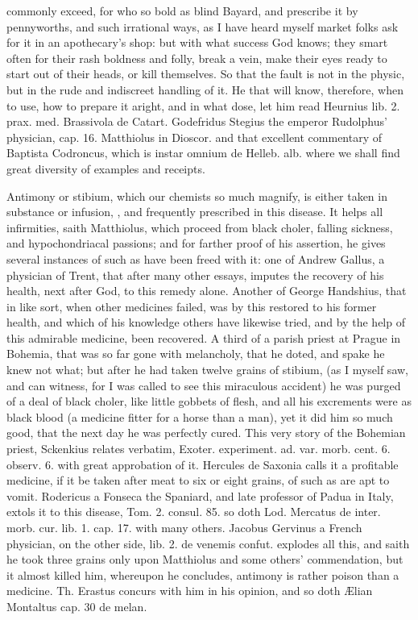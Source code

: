 {commonly exceed, for who so bold as blind Bayard, and prescribe it by
pennyworths, and such irrational ways, as I have heard myself market
folks ask for it in an apothecary's shop: but with what success God
knows; they smart often for their rash boldness and folly, break a
vein, make their eyes ready to start out of their heads, or kill
themselves. So that the fault is not in the physic, but in the rude and
indiscreet handling of it. He that will know, therefore, when to use,
how to prepare it aright, and in what dose, let him read Heurnius lib.
2. prax. med. Brassivola de Catart. Godefridus Stegius the emperor
Rudolphus' physician, cap. 16. Matthiolus in Dioscor. and that
excellent commentary of Baptista Codroncus, which is instar omnium de
Helleb. alb. where we shall find great diversity of examples and
receipts.

Antimony or stibium, which our chemists so much magnify, is either
taken in substance or infusion, \etc{}, and frequently prescribed in this
disease. It helps all infirmities, saith Matthiolus, which
proceed from black choler, falling sickness, and hypochondriacal
passions; and for farther proof of his assertion, he gives several
instances of such as have been freed with it: one of Andrew
Gallus, a physician of Trent, that after many other essays, imputes the
recovery of his health, next after God, to this remedy alone. Another
of George Handshius, that in like sort, when other medicines failed,
was by this restored to his former health, and which of his
knowledge others have likewise tried, and by the help of this admirable
medicine, been recovered. A third of a parish priest at Prague in
Bohemia, that was so far gone with melancholy, that he doted, and
spake he knew not what; but after he had taken twelve grains of
stibium, (as I myself saw, and can witness, for I was called to see
this miraculous accident) he was purged of a deal of black choler, like
little gobbets of flesh, and all his excrements were as black blood (a
medicine fitter for a horse than a man), yet it did him so much good,
that the next day he was perfectly cured. This very story of the
Bohemian priest, Sckenkius relates verbatim, Exoter. experiment. ad.
var. morb. cent. 6. observ. 6. with great approbation of it. Hercules
de Saxonia calls it a profitable medicine, if it be taken after meat to
six or eight grains, of such as are apt to vomit. Rodericus a Fonseca
the Spaniard, and late professor of Padua in Italy, extols it to this
disease, Tom. 2. consul. 85. so doth Lod. Mercatus de inter. morb. cur.
lib. 1. cap. 17. with many others. Jacobus Gervinus a French physician,
on the other side, lib. 2. de venemis confut. explodes all this, and
saith he took three grains only upon Matthiolus and some others'
commendation, but it almost killed him, whereupon he concludes,
antimony is rather poison than a medicine. Th. Erastus concurs
with him in his opinion, and so doth \AE{}lian Montaltus cap. 30 de melan.

}
